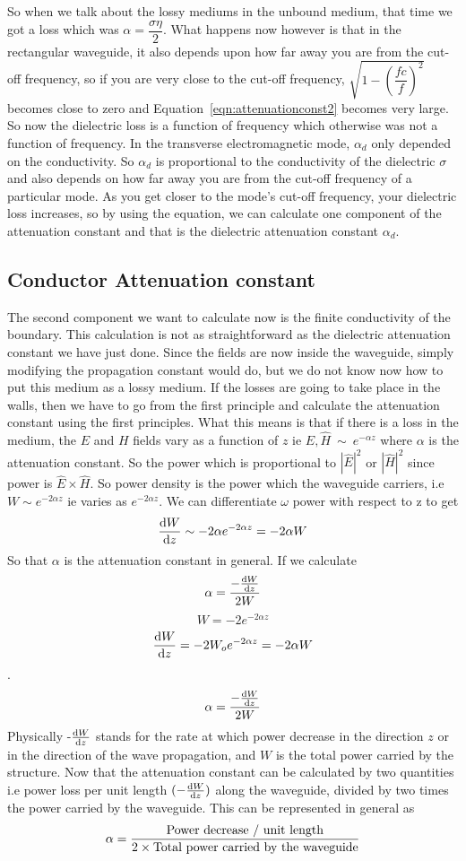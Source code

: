 So when we talk about the lossy mediums in the unbound medium, that time we got a loss which was $\alpha = \dfrac{\sigma\eta}{2}$. What happens now however is that in the rectangular waveguide, it also depends upon how far away you are from the cut-off frequency, so if you are very close to the cut-off frequency, $\sqrt{1 - \left(\dfrac{fc}{f}\right)^{2}}$ becomes close to zero and Equation~\eqref{eqn:attenuationconst2} becomes very large. So now the dielectric loss is a function of frequency which otherwise was not a function of frequency. In the transverse electromagnetic mode,  $\alpha_{d}$ only depended on the conductivity. So $\alpha_{d}$ is proportional to the conductivity of the dielectric $\sigma$ and also depends on how far away you are from the cut-off frequency of a particular mode. As you get closer to the mode's cut-off frequency, your dielectric loss increases, so by using the equation, we can calculate one component of the attenuation constant and that is the dielectric attenuation constant $\alpha_{d}$.

\subsection{Conductor Attenuation constant}
The second component we want to calculate now is the finite conductivity of the boundary. This calculation is not as straightforward as the dielectric attenuation constant we have just done. Since the fields are now inside the waveguide, simply modifying the propagation constant would do, but we do not know now how to put this medium as a lossy medium. If the losses are going to take place in the walls, then we have to go from the first principle and calculate the attenuation constant using the first principles. What this means is that if there is a loss in the medium, the $E$ and $H$ fields vary as a function of $z$ ie $ {\hat{E}}, {\hat{H}} \ \sim\ e^{-\alpha z}$ where $\alpha$ is the attenuation constant. So the power which is proportional to $|{\hat{E}}|^{2}$ or $|{\hat{H}}|^{2}$ since power is ${\hat{E}}\times{\hat{H}}$. So power density is the power which the waveguide carriers, i.e $W\sim e^{-2\alpha z}$ ie varies as $e^{-2\alpha z}$. We can differentiate $\omega$ power with respect to z to get 
$$\dv{W}{z}\sim-2\alpha e^{-2\alpha z} = -2\alpha W$$ 
So that $\alpha$ is the attenuation constant in general. If we calculate 
$$\alpha = \dfrac{-\dv{W}{z}}{2W}$$
$$W = -2e^{-2\alpha z}$$ 
$$\dv{W}{z} = -2W_o e^{-2\alpha z} = -2\alpha W$$. 
$$\alpha = \dfrac{-\dv{W}{z}}{2W}$$ 
Physically -$\dv{W}{z}$ stands for the rate at which power decrease in the direction $z$ or in the direction of the wave propagation, and $W$ is the total power carried by the structure. Now that the attenuation constant can be calculated by two quantities i.e power loss per unit length $(-\dv{W}{z})$  along the waveguide, divided by two times the power carried by the waveguide. This can be represented in general as
\begin{dmath}
\alpha = \dfrac{\textnormal{Power decrease / unit length}}{2\times \textnormal{Total power carried by the waveguide}}
\end{dmath}

